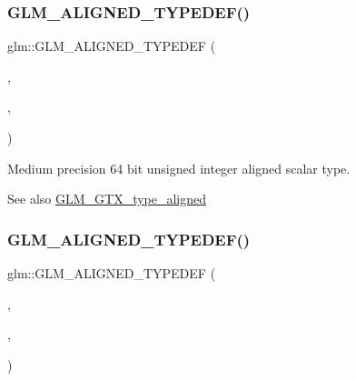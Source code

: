 \subsubsection{\texorpdfstring{G\+L\+M\+\_\+\+A\+L\+I\+G\+N\+E\+D\+\_\+\+T\+Y\+P\+E\+D\+E\+F()}{GLM\_ALIGNED\_TYPEDEF()}\hspace{0.1cm}{\footnotesize\ttfamily [88/209]}}
{\footnotesize\ttfamily glm\+::\+G\+L\+M\+\_\+\+A\+L\+I\+G\+N\+E\+D\+\_\+\+T\+Y\+P\+E\+D\+EF (\begin{DoxyParamCaption}\item[{\hyperlink{group__gtc__type__precision_gaa97354d3120a6dc029a5e9563723de18}{mediump\+\_\+uint64\+\_\+t}}]{,  }\item[{aligned\+\_\+mediump\+\_\+uint64\+\_\+t}]{,  }\item[{8}]{ }\end{DoxyParamCaption})}

Medium precision 64 bit unsigned integer aligned scalar type. \begin{DoxySeeAlso}{See also}
\hyperlink{group__gtx__type__aligned}{G\+L\+M\+\_\+\+G\+T\+X\+\_\+type\+\_\+aligned} 
\end{DoxySeeAlso}
\mbox{\label{group__gtx__type__aligned_gada8b996eb6526dc1ead813bd49539d1b}} 
\subsubsection{\texorpdfstring{G\+L\+M\+\_\+\+A\+L\+I\+G\+N\+E\+D\+\_\+\+T\+Y\+P\+E\+D\+E\+F()}{GLM\_ALIGNED\_TYPEDEF()}\hspace{0.1cm}{\footnotesize\ttfamily [89/209]}}
{\footnotesize\ttfamily glm\+::\+G\+L\+M\+\_\+\+A\+L\+I\+G\+N\+E\+D\+\_\+\+T\+Y\+P\+E\+D\+EF (\begin{DoxyParamCaption}\item[{\hyperlink{group__gtc__type__precision_gac04b372784392e82bd557f300c4de097}{mediump\+\_\+u8}}]{,  }\item[{aligned\+\_\+mediump\+\_\+u8}]{,  }\item[{1}]{ }\end{DoxyParamCaption})}


